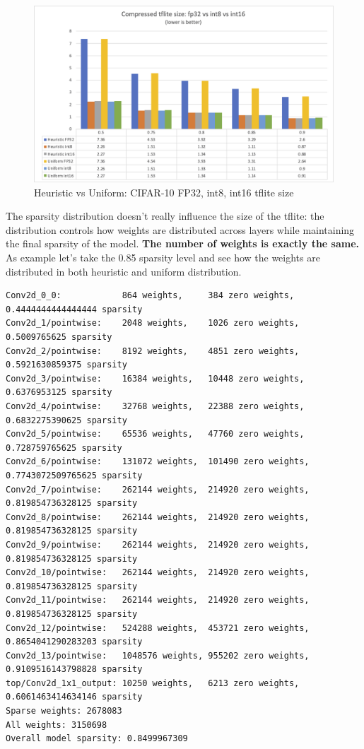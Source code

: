 \begin{figure}[ht]
    \includegraphics[width=\linewidth]{images/results/cifar10_tflite_size.png}
    \centering
    \caption{Heuristic vs Uniform: CIFAR-10 FP32, int8, int16 tflite size}\label{fig:cifar10_tflite_size}
\end{figure}

The sparsity distribution doesn't really influence the size of the tflite:
the distribution controls how weights are distributed across layers while
maintaining the final sparsity of the model. \textbf{The number of weights is
exactly the same.}
As example let's take the 0.85 sparsity level and see how the weights are
distributed in both heuristic and uniform distribution.

\begin{lstlisting}[label={lst:heuristic_weights_cifar10},
    caption=MobileNet v1 and CIFAR-10: heuristic weights distributions]
Conv2d_0_0:            864 weights,     384 zero weights,    0.4444444444444444 sparsity
Conv2d_1/pointwise:    2048 weights,    1026 zero weights,   0.5009765625 sparsity
Conv2d_2/pointwise:    8192 weights,    4851 zero weights,   0.5921630859375 sparsity
Conv2d_3/pointwise:    16384 weights,   10448 zero weights,  0.6376953125 sparsity
Conv2d_4/pointwise:    32768 weights,   22388 zero weights,  0.6832275390625 sparsity
Conv2d_5/pointwise:    65536 weights,   47760 zero weights,  0.728759765625 sparsity
Conv2d_6/pointwise:    131072 weights,  101490 zero weights, 0.7743072509765625 sparsity
Conv2d_7/pointwise:    262144 weights,  214920 zero weights, 0.819854736328125 sparsity
Conv2d_8/pointwise:    262144 weights,  214920 zero weights, 0.819854736328125 sparsity
Conv2d_9/pointwise:    262144 weights,  214920 zero weights, 0.819854736328125 sparsity
Conv2d_10/pointwise:   262144 weights,  214920 zero weights, 0.819854736328125 sparsity
Conv2d_11/pointwise:   262144 weights,  214920 zero weights, 0.819854736328125 sparsity
Conv2d_12/pointwise:   524288 weights,  453721 zero weights, 0.8654041290283203 sparsity
Conv2d_13/pointwise:   1048576 weights, 955202 zero weights, 0.9109516143798828 sparsity
top/Conv2d_1x1_output: 10250 weights,   6213 zero weights,   0.6061463414634146 sparsity
Sparse weights: 2678083
All weights: 3150698
Overall model sparsity: 0.8499967309
\end{lstlisting}

